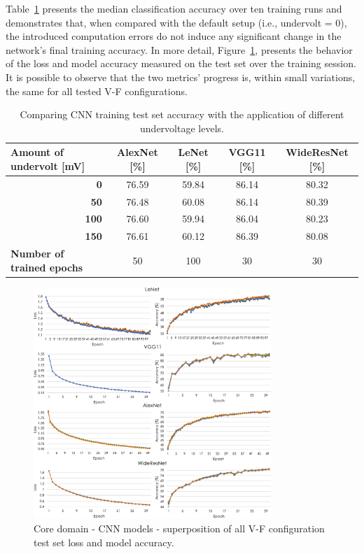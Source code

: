 Table~\ref{tab:trainingAcc} presents the median classification accuracy over ten training runs and demonstrates that, when compared with the default setup (i.e., undervolt = 0), the introduced computation errors do not induce any significant change in the network's final training accuracy. 
In more detail, Figure~\ref{fig:CNN_loss}, presents the behavior of the loss and model accuracy measured on the test set over the training session. It is possible to observe that the two metrics' progress is, within small variations, the same for all tested V-F configurations.

\begin{table}[htb]
    \centering
    \caption{Comparing CNN training test set accuracy with the application of different undervoltage levels.}
    \label{tab:trainingAcc}
    \begin{tabular}{rcccc}
        \multicolumn{1}{l}{{\textbf{Amount of undervolt {[}mV{]}}}} &
          \textbf{AlexNet {[}\%{]}} &
          \textbf{LeNet {[}\%{]}} &
          \textbf{VGG11 {[}\%{]}} &
          \textbf{WideResNet {[}\%{]}} \\ \hline
        \textbf{0}   & 76.59 & 59.84 & 86.14 & 80.32 \\
        \textbf{50}  & 76.48 & 60.08 & 86.14 & 80.39 \\
        \textbf{100} & 76.60 & 59.94 & 86.04 & 80.23 \\
        \textbf{150} & 76.61 & 60.12 & 86.39 & 80.08 \\ \hline
        \multicolumn{1}{l}{{\textbf{Number of trained epochs}}} &
          50 &
          100 &
          30 &
          30
    \end{tabular}%
    
\end{table}


\begin{figure}[htb]
    \centering
        \includegraphics[width=0.8\textwidth]{Figures/Application To Deep Learning/CNN_loss_acc.pdf}
        \caption{Core domain - CNN models - superposition of all V-F configuration test set loss and model accuracy.}
    \label{fig:CNN_loss}
\end{figure}

